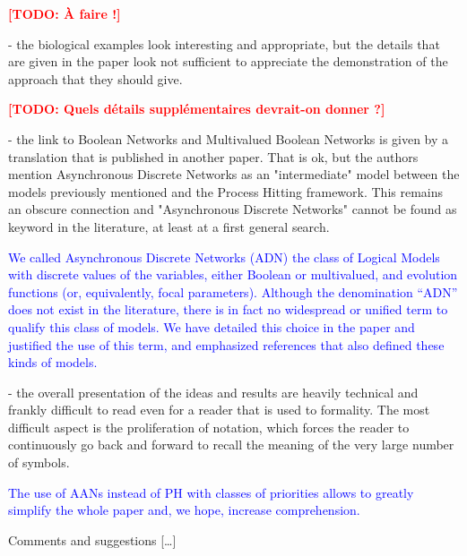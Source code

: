 \documentclass[11pt]{article}
\newcommand{\todo}[1]{\textcolor{red}{\textbf{[TODO: #1]}}}
\newcommand{\answer}[1]{\textcolor{blue}{#1}\vspace*{1em}}
\begin{document}
\todo{À faire !}

- the biological examples look interesting and appropriate, but the details that are given in the paper look not sufficient to appreciate the demonstration of the approach that they should give.

\todo{Quels détails supplémentaires devrait-on donner ?}

- the link to Boolean Networks and Multivalued Boolean Networks is given by a translation that is published in another paper. That is ok, but the authors mention Asynchronous Discrete Networks as an "intermediate" model between the models previously mentioned and the Process Hitting framework. This remains an obscure connection and "Asynchronous Discrete Networks" cannot be found as keyword in the literature, at least at a first general search. 

\answer{
We called Asynchronous Discrete Networks (ADN) the class of Logical Models
with discrete values of the variables,
either Boolean or multivalued,
and evolution functions (or, equivalently, focal parameters).
Although the denomination “ADN” does not exist in the literature,
there is in fact no widespread or unified term to qualify this class of models.
We have detailed this choice in the paper and justified the use of this term,
and emphasized references that also defined these kinds of models.
}

- the overall presentation of the ideas and results are heavily technical and frankly difficult to read even for a reader that is used to formality. The most difficult aspect is the proliferation of notation, which forces the reader to continuously go back and forward to recall the meaning of the very large number of symbols. 

\answer{
The use of AANs instead of PH with classes of priorities
allows to greatly simplify the whole paper
and, we hope, increase comprehension.
}

Comments and suggestions […]
\end{document}
